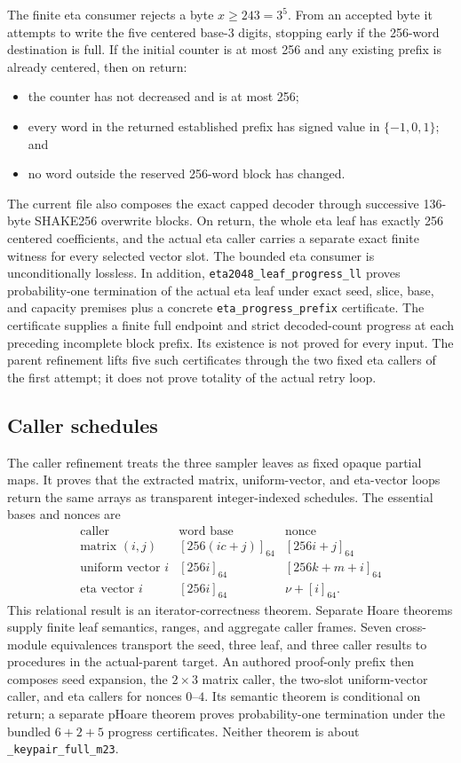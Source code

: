 \documentclass[11pt]{article}
\theoremstyle{definition}
\theoremstyle{plain}
\theoremstyle{remark}
\newcommand{\code}[1]{\nolinkurl{#1}}
\begin{document}
The finite eta consumer rejects a byte $x\ge243=3^5$.  From an accepted byte
it attempts to write the five centered base-3 digits, stopping early if the
256-word destination is full.  If the initial counter is at most 256 and any
existing prefix is already centered, then on return:
\begin{itemize}
\item the counter has not decreased and is at most 256;
\item every word in the returned established prefix has signed value in
  $\{-1,0,1\}$; and
\item no word outside the reserved 256-word block has changed.
\end{itemize}
The current file also composes the exact capped decoder through successive
136-byte SHAKE256 overwrite blocks.  On return, the whole eta leaf has exactly
256 centered coefficients, and the actual eta caller carries a separate exact
finite witness for every selected vector slot.  The bounded eta consumer is
unconditionally lossless.  In addition, \code{eta2048_leaf_progress_ll} proves
probability-one termination of the actual eta leaf under exact seed, slice,
base, and capacity premises plus a concrete
\code{eta_progress_prefix} certificate.  The certificate supplies a finite
full endpoint and strict decoded-count progress at each preceding incomplete
block prefix.  Its existence is not proved for every input.  The parent
refinement lifts five such certificates through the two fixed eta callers of
the first attempt; it does not prove totality of the actual retry loop.

\subsection{Caller schedules}

The caller refinement treats the three sampler leaves as fixed opaque partial
maps.  It proves that the extracted matrix, uniform-vector, and eta-vector
loops return the same arrays as transparent integer-indexed schedules.  The
essential bases and nonces are
\[
\begin{array}{c|c|c}
\text{caller} & \text{word base} & \text{nonce}\\
\hline
\text{matrix }(i,j) & [256(ic+j)]_{64} & [256i+j]_{64}\\
\text{uniform vector }i & [256i]_{64} & [256k+m+i]_{64}\\
\text{eta vector }i & [256i]_{64} & \nu+[i]_{64}.
\end{array}
\]
This relational result is an iterator-correctness theorem.  Separate Hoare
theorems supply finite leaf semantics, ranges, and aggregate caller frames.
Seven cross-module equivalences transport the seed, three leaf, and three
caller results to procedures in the actual-parent target.  An authored
proof-only prefix then composes seed expansion, the \(2\times3\) matrix caller,
the two-slot uniform-vector caller, and eta callers for nonces \(0\)--\(4\).
Its semantic theorem is conditional on return; a separate pHoare theorem
proves probability-one termination under the bundled \(6+2+5\) progress
certificates.  Neither theorem is about \code{_keypair_full_m23}.
\end{document}
